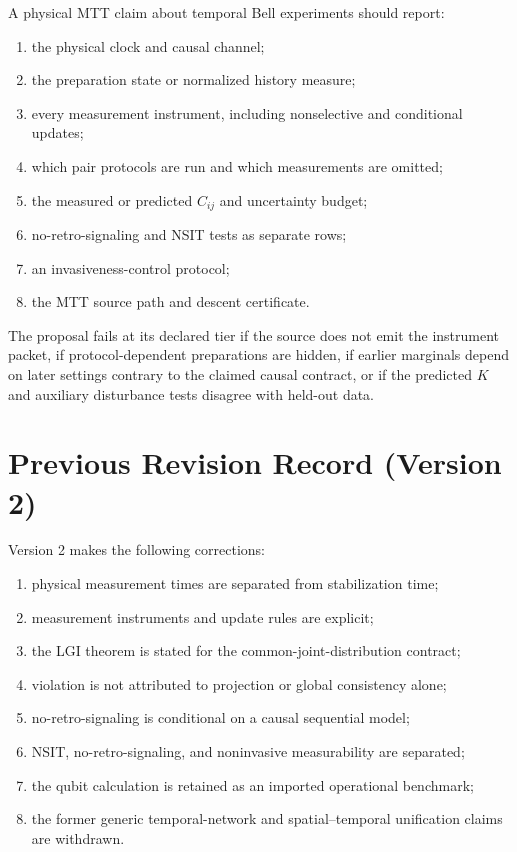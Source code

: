 \documentclass[11pt]{article}
\theoremstyle{definition}
\theoremstyle{remark}
\begin{document}
A physical MTT claim about temporal Bell experiments should report:
\begin{enumerate}[label=\textbf{T\arabic*.}]
\item the physical clock and causal channel;
\item the preparation state or normalized history measure;
\item every measurement instrument, including nonselective and conditional
  updates;
\item which pair protocols are run and which measurements are omitted;
\item the measured or predicted $C_{ij}$ and uncertainty budget;
\item no-retro-signaling and NSIT tests as separate rows;
\item an invasiveness-control protocol;
\item the MTT source path and descent certificate.
\end{enumerate}

The proposal fails at its declared tier if the source does not emit the
instrument packet, if protocol-dependent preparations are hidden, if
earlier marginals depend on later settings contrary to the claimed causal
contract, or if the predicted $K$ and auxiliary disturbance tests disagree
with held-out data.

\section{Previous Revision Record (Version 2)}

Version 2 makes the following corrections:
\begin{enumerate}[label=\arabic*.]
\item physical measurement times are separated from stabilization time;
\item measurement instruments and update rules are explicit;
\item the LGI theorem is stated for the common-joint-distribution contract;
\item violation is not attributed to projection or global consistency alone;
\item no-retro-signaling is conditional on a causal sequential model;
\item NSIT, no-retro-signaling, and noninvasive measurability are separated;
\item the qubit calculation is retained as an imported operational benchmark;
\item the former generic temporal-network and spatial--temporal unification
  claims are withdrawn.
\end{enumerate}
\end{document}
